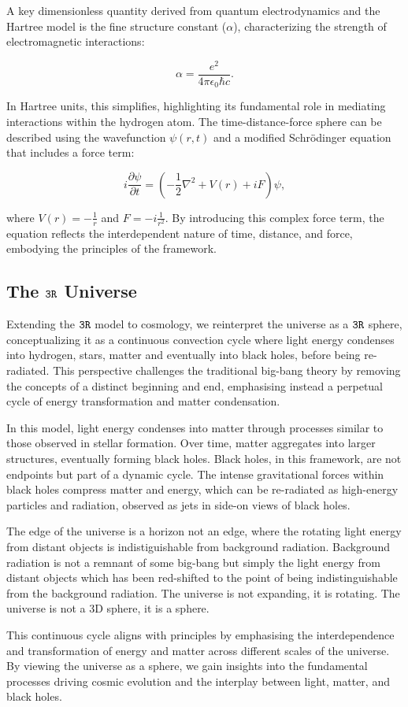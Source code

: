 \documentclass[12pt]{article}
\begin{document}
A key dimensionless quantity derived from quantum electrodynamics and the Hartree model is the fine structure constant (\(\alpha\)), characterizing the strength of electromagnetic interactions:

\[
    \alpha = \frac{e^2}{4\pi \epsilon_0 \hbar c}.
\]

In Hartree units, this simplifies, highlighting its fundamental role in mediating interactions within the hydrogen atom. The time-distance-force sphere can be described using the wavefunction \(\psi(r, t)\) and a modified Schrödinger equation that includes a force term:

\[
    i \frac{\partial \psi}{\partial t} = \left( -\frac{1}{2} \nabla^2 + V(r) + iF \right) \psi,
\]

where \(V(r) = -\frac{1}{r}\) and \(F = -i \frac{1}{r^2}\). By introducing this complex force term, the equation reflects the interdependent nature of time, distance, and force, embodying the principles of the \iR{} framework.

\subsection*{The \(\texttt{3R}\) Universe}

Extending the \(\texttt{3R}\) model to cosmology, we reinterpret the universe as a \(\texttt{3R}\) sphere, conceptualizing it as a continuous convection cycle where light energy condenses into hydrogen, stars, matter and eventually into black holes, before being re-radiated. This perspective challenges the traditional big-bang theory by removing the concepts of a distinct beginning and end, emphasising instead a perpetual cycle of energy transformation and matter condensation.

In this model, light energy condenses into matter through processes similar to those observed in stellar formation. Over time, matter aggregates into larger structures, eventually forming black holes. Black holes, in this framework, are not endpoints but part of a dynamic cycle. The intense gravitational forces within black holes compress matter and energy, which can be re-radiated as high-energy particles and radiation, observed as jets in side-on views of black holes.

The edge of the universe is a horizon not an edge, where the rotating light energy from distant objects is indistiguishable from background radiation. Background radiation is not a remnant of some big-bang but simply the light energy from distant objects which has been red-shifted to the point of being indistinguishable from the background radiation. The universe is not expanding, it is rotating. The universe is not a 3D sphere, it is a \iR{} sphere.

This continuous cycle aligns with \iR{} principles by emphasising the interdependence and transformation of energy and matter across different scales of the universe. By viewing the universe as a \iR{} sphere, we gain insights into the fundamental processes driving cosmic evolution and the interplay between light, matter, and black holes.
\end{document}
